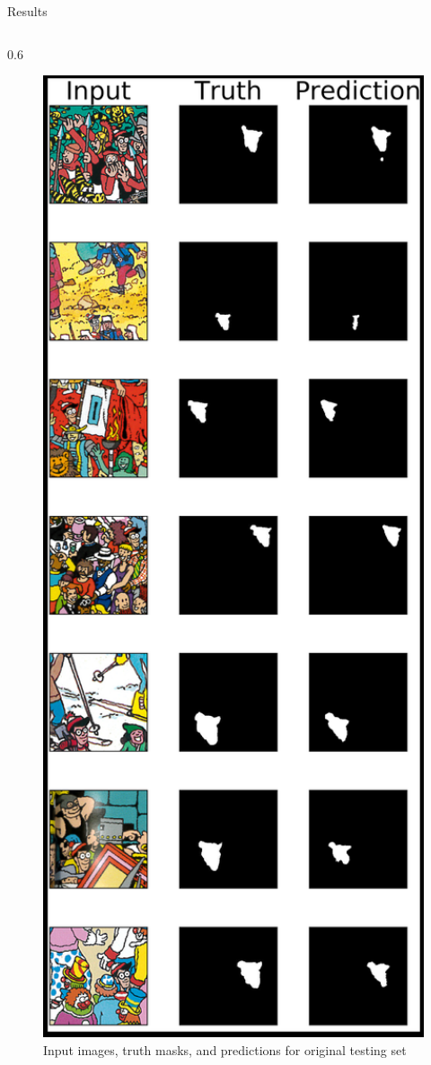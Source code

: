 \documentclass[final]{beamer}
\newlength{\onecolwid}
\newlength{\twocolwid}
\begin{document}
\begin{frame}[t]
\begin{columns}[t]
\begin{column}{\twocolwid}
\begin{alertblock}{Results}
\begin{columns}[t,totalwidth=0.95\twocolwid] %
\begin{column}{0.6\onecolwid}\vspace{-.6in}
\begin{figure}
    \centering
    \includegraphics[width = 1.1\textwidth]{pictures/results.png}
    \caption{Input images, truth masks, and predictions for  original testing set}
    \label{fig:results}
\end{figure}
\end{column}


\end{columns}
\end{alertblock}
\end{column}
\end{columns}
\end{frame}
\end{document}
